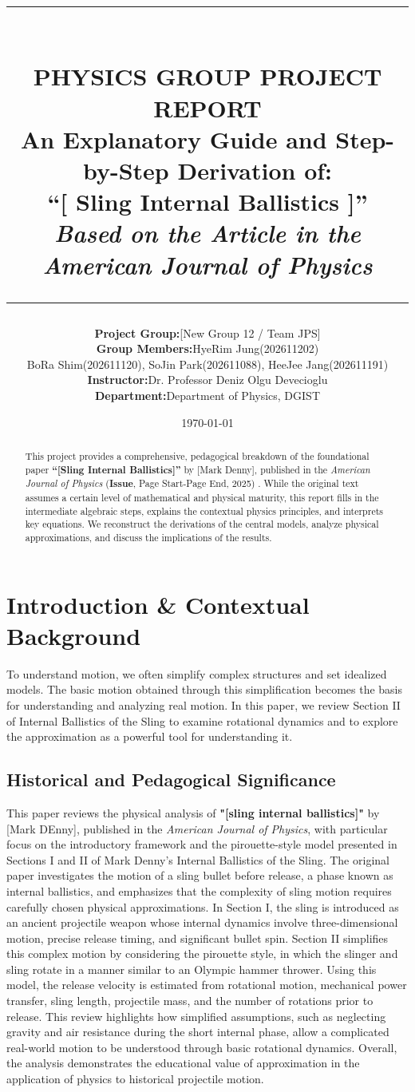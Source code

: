 \documentclass[11pt,letterpaper]{article}
\title{
\vspace{-1.5in}
\rule{\linewidth}{1.5pt} \\ \vspace{4mm}
\large\textbf{PHYSICS GROUP PROJECT REPORT} \\ \vspace{2mm}
\Large\textbf{An Explanatory Guide and Step-by-Step
Derivation of: \\ ``[ Sling Internal Ballistics ]''}
\\ \vspace{4mm}
\large\textit{Based on the Article in the American Journal of
Physics} \\
\rule{\linewidth}{1.5pt}
}
\author{
\begin{tabular}{r @{\quad} l}
\textbf{Project Group:} & [New Group 12 / Team
JPS] \\[1ex]
\textbf{Group Members:} & HyeRim Jung(202611202)\\
& BoRa Shim(202611120), SoJin Park(202611088), HeeJee Jang(202611191)\\
\textbf{Instructor:}    & Dr. Professor Deniz Olgu Devecioglu \\
\textbf{Department:}    & Department of Physics, DGIST
\end{tabular}
}
\date{\today}
\begin{document}
\maketitle
\begin{abstract}
This project provides a comprehensive, pedagogical breakdown
of the foundational paper \textbf{``[Sling Internal Ballistics]''} by
[Mark Denny], published in the \textit{American
Journal of Physics} (\textbf{Issue}, Page Start-Page End, 2025)
\cite{originalpaper}. While the original text assumes a
certain level of mathematical and physical maturity, this
report fills in the intermediate algebraic steps, explains
the contextual physics principles, and interprets key
equations. We reconstruct the derivations of the central
models, analyze physical approximations, and discuss the
implications of the results.
\end{abstract}
\tableofcontents

\section{Introduction \& Contextual Background}
To understand motion, we often simplify complex structures and set idealized models. The basic motion obtained through this simplification becomes the basis for understanding and analyzing real motion. In this paper, we review Section II of Internal Ballistics of the Sling to examine rotational dynamics and to explore the approximation as a powerful tool for understanding it.
\subsection{Historical and Pedagogical Significance}
This paper reviews the physical analysis of \textbf{"[sling internal ballistics]"} by [Mark DEnny], published in the \textit{American Journal of Physics}, with particular focus on the introductory framework and the pirouette-style model presented in Sections I and II of Mark Denny’s Internal Ballistics of the Sling. The original paper investigates the motion of a sling bullet before release, a phase known as internal ballistics, and emphasizes that the complexity of sling motion requires carefully chosen physical approximations. In Section I, the sling is introduced as an ancient projectile weapon whose internal dynamics involve three-dimensional motion, precise release timing, and significant bullet spin. Section II simplifies this complex motion by considering the pirouette style, in which the slinger and sling rotate in a manner similar to an Olympic hammer thrower. Using this model, the release velocity is estimated from rotational motion, mechanical power transfer, sling length, projectile mass, and the number of rotations prior to release. This review highlights how simplified assumptions, such as neglecting gravity and air resistance during the short internal phase, allow a complicated real-world motion to be understood through basic rotational dynamics. Overall, the analysis demonstrates the educational value of approximation in the application of physics to historical projectile motion.
\end{document}

